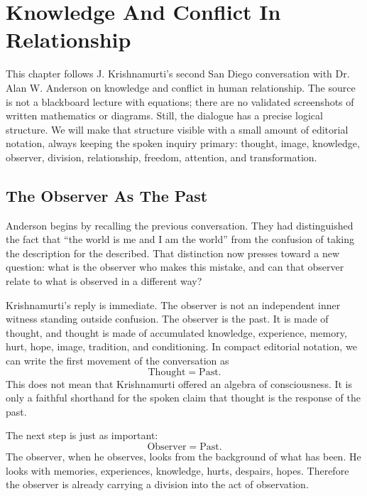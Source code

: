 \chapter{Knowledge And Conflict In Relationship}

This chapter follows J. Krishnamurti's second San Diego conversation with Dr. Alan W. Anderson on knowledge and conflict in human relationship. The source is not a blackboard lecture with equations; there are no validated screenshots of written mathematics or diagrams. Still, the dialogue has a precise logical structure. We will make that structure visible with a small amount of editorial notation, always keeping the spoken inquiry primary: thought, image, knowledge, observer, division, relationship, freedom, attention, and transformation.

\section{The Observer As The Past}

Anderson begins by recalling the previous conversation. They had distinguished the fact that ``the world is me and I am the world'' from the confusion of taking the description for the described. That distinction now presses toward a new question: what is the observer who makes this mistake, and can that observer relate to what is observed in a different way?

Krishnamurti's reply is immediate. The observer is not an independent inner witness standing outside confusion. The observer is the past. It is made of thought, and thought is made of accumulated knowledge, experience, memory, hurt, hope, image, tradition, and conditioning. In compact editorial notation, we can write the first movement of the conversation as
\begin{equation}
\mathrm{Thought}=\mathrm{Past}.
\end{equation}
This does not mean that Krishnamurti offered an algebra of consciousness. It is only a faithful shorthand for the spoken claim that thought is the response of the past.

The next step is just as important:
\begin{equation}
\mathrm{Observer}=\mathrm{Past}.
\end{equation}
The observer, when he observes, looks from the background of what has been. He looks with memories, experiences, knowledge, hurts, despairs, hopes. Therefore the observer is already carrying a division into the act of observation.

